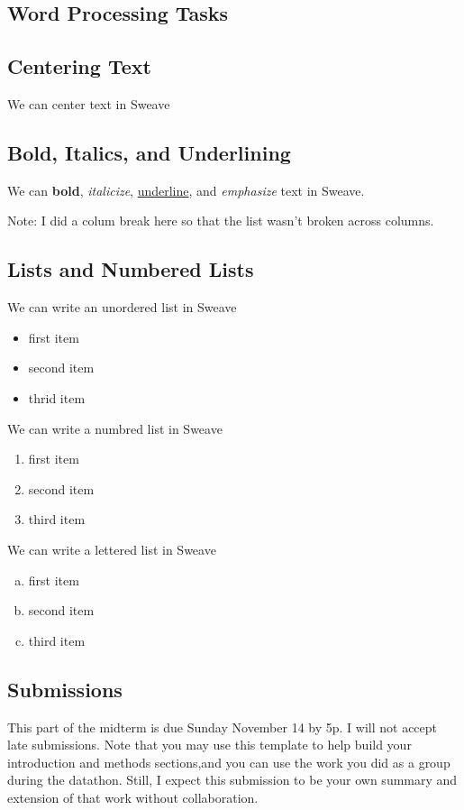 \documentclass{article}\usepackage[]{graphicx}\usepackage[]{xcolor}
\begin{document}
\begin{multicols}{2}
\section{Word Processing Tasks}

\subsection{Centering Text}
\begin{center}
We can center text in Sweave
\end{center}


\subsection{Bold, Italics, and Underlining}
We can \textbf{bold}, \emph{italicize}, \underline{underline}, and \emph{emphasize} text
in Sweave.

Note: I did a colum break here so that the list wasn't 
broken across columns.

\columnbreak

\subsection{Lists and Numbered Lists}
We can write an unordered list in Sweave
\begin{itemize}
  \item first item
  \item second item
  \item thrid item
\end{itemize}
We can write a numbred list in Sweave
\begin{enumerate}
  \item first item
  \item second item
  \item third item
\end{enumerate}
We can write a lettered list in Sweave
\begin{enumerate}[a.]\itemsep0em
  \item first item
  \item second item
  \item third item
\end{enumerate}




\subsection{Submissions}
 This part of the midterm is due Sunday November 14 by 5p.
 I will not accept late submissions. Note that you may use
 this template to help build your introduction and methods
 sections,and you can use the work you did as a group during
 the datathon. Still, I expect this submission to be your own
 summary and extension of that work without collaboration.



\end{multicols}
\end{document}
